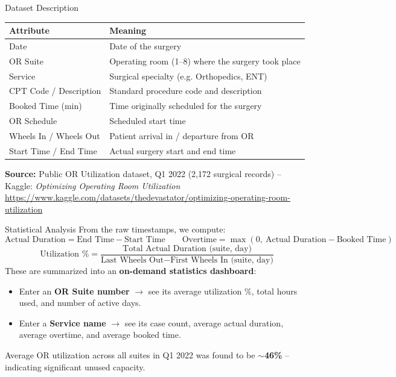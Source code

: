 \documentclass[aspectratio=169]{beamer}
\begin{document}
\begin{frame}{Dataset Description}
    \begin{center}
    \small
    \begin{tabular}{ll}
        \toprule
        \textbf{Attribute} & \textbf{Meaning} \\
        \midrule
        Date & Date of the surgery \\
        OR Suite & Operating room (1--8) where the surgery took place \\
        Service & Surgical specialty (e.g. Orthopedics, ENT) \\
        CPT Code / Description & Standard procedure code and description \\
        Booked Time (min) & Time originally scheduled for the surgery \\
        OR Schedule & Scheduled start time \\
        Wheels In / Wheels Out & Patient arrival in / departure from OR \\
        Start Time / End Time & Actual surgery start and end time \\
        \bottomrule
    \end{tabular}
    \end{center}
    \vspace{8pt}
    \textbf{Source:} Public OR Utilization dataset, Q1 2022 (2{,}172 surgical
    records) -- Kaggle: \textit{Optimizing Operating Room Utilization}\\
    \url{https://www.kaggle.com/datasets/thedevastator/optimizing-operating-room-utilization}
\end{frame}

\begin{frame}{Statistical Analysis}
    From the raw timestamps, we compute:
    \[
        \text{Actual Duration} = \text{End Time} - \text{Start Time}
        \qquad
        \text{Overtime} = \max(0,\ \text{Actual Duration} - \text{Booked Time})
    \]
    \[
        \text{Utilization \%} = \frac{\text{Total Actual Duration (suite, day)}}
        {\text{Last Wheels Out} - \text{First Wheels In (suite, day)}}
    \]
    \vspace{4pt}
    These are summarized into an \textbf{on-demand statistics dashboard}:
    \begin{itemize}
        \item Enter an \textbf{OR Suite number} $\rightarrow$ see its average
        utilization \%, total hours used, and number of active days.
        \item Enter a \textbf{Service name} $\rightarrow$ see its case count,
        average actual duration, average overtime, and average booked time.
    \end{itemize}
    Average OR utilization across all suites in Q1 2022 was found to be
    \textbf{$\sim$46\%} -- indicating significant unused capacity.
\end{frame}
\end{document}
